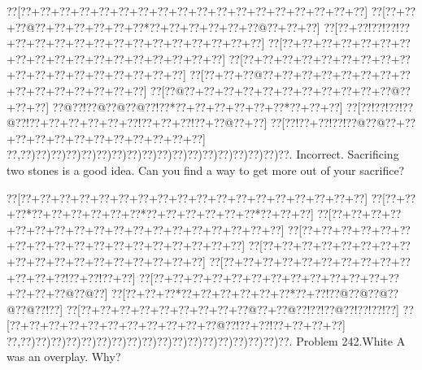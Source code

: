 \documentclass[a5paper]{article}
\begin{document}
\begin{center}
{\goo
\0??[\0??+\0??+\0??+\0??+\0??+\0??+\0??+\0??+\0??+\0??+\0??+\0??+\0??+\0??+\0??+\0??+\0??+\0??]
\0??[\0??+\0??+\0??@\0??+\0??+\0??+\0??+\0??+\0??*\0??+\0??+\0??+\0??+\0??+\0??@\0??+\0??+\0??]
\0??[\0??+\0??!\0??!\0??!\0??+\0??+\0??+\0??+\0??+\0??+\0??+\0??+\0??+\0??+\0??+\0??+\0??+\0??]
\0??[\0??+\0??+\0??+\0??+\0??+\0??+\0??+\0??+\0??+\0??+\0??+\0??+\0??+\0??+\0??+\0??+\0??+\0??]
\0??[\0??+\0??+\0??+\0??+\0??+\0??+\0??+\0??+\0??+\0??+\0??+\0??+\0??+\0??+\0??+\0??+\0??+\0??]
\0??[\0??+\0??+\0??@\0??+\0??+\0??+\0??+\0??+\0??+\0??+\0??+\0??+\0??+\0??+\0??+\0??+\0??+\0??]
\0??[\0??@\0??+\0??+\0??+\0??+\0??+\0??+\0??+\0??+\0??+\0??+\0??@\0??+\0??+\0??]
\0??@\0??!\0??@\0??@\0??@\0??!\0??*\0??+\0??+\0??+\0??+\0??+\0??*\0??+\0??+\0??]
\0??[\0??!\0??!\0??!\0??@\0??!\0??+\0??+\0??+\0??+\0??+\0??!\0??+\0??+\0??!\0??+\0??@\0??+\0??]
\0??[\0??!\0??+\0??!\0??!\0??@\0??@\0??+\0??+\0??+\0??+\0??+\0??+\0??+\0??+\0??+\0??+\0??+\0??]
\0??,\0??)\0??)\0??)\0??)\0??)\0??)\0??)\0??)\0??)\0??)\0??)\0??)\0??)\0??)\0??)\0??)\0??)\0??.
}
Incorrect. Sacrificing two stones is a good idea. Can you find a way to get more out of your sacrifice?

\end{center}
\newpage
\begin{center}
{\goo
\0??[\0??+\0??+\0??+\0??+\0??+\0??+\0??+\0??+\0??+\0??+\0??+\0??+\0??+\0??+\0??+\0??+\0??+\0??]
\0??[\0??+\0??+\0??*\0??+\0??+\0??+\0??+\0??+\0??*\0??+\0??+\0??+\0??+\0??+\0??*\0??+\0??+\0??]
\0??[\0??+\0??+\0??+\0??+\0??+\0??+\0??+\0??+\0??+\0??+\0??+\0??+\0??+\0??+\0??+\0??+\0??+\0??]
\0??[\0??+\0??+\0??+\0??+\0??+\0??+\0??+\0??+\0??+\0??+\0??+\0??+\0??+\0??+\0??+\0??+\0??+\0??]
\0??[\0??+\0??+\0??+\0??+\0??+\0??+\0??+\0??+\0??+\0??+\0??+\0??+\0??+\0??+\0??+\0??+\0??+\0??]
\0??[\0??+\0??+\0??+\0??+\0??+\0??+\0??+\0??+\0??+\0??+\0??+\0??+\0??!\0??+\0??!\0??+\0??]
\0??[\0??+\0??+\0??+\0??+\0??+\0??+\0??+\0??+\0??+\0??+\0??+\0??+\0??+\0??+\0??+\0??@\0??@\0??]
\0??[\0??+\0??+\0??*\0??+\0??+\0??+\0??+\0??+\0??*\0??+\0??!\0??@\0??@\0??@\0??@\0??@\0??!\0??]
\0??[\0??+\0??+\0??+\0??+\0??+\0??+\0??+\0??+\0??@\0??+\0??@\0??!\0??!\0??@\0??!\0??!\0??!\0??]
\0??[\0??+\0??+\0??+\0??+\0??+\0??+\0??+\0??+\0??+\0??+\0??@\0??!\0??+\0??!\0??+\0??+\0??+\0??]
\0??,\0??)\0??)\0??)\0??)\0??)\0??)\0??)\0??)\0??)\0??)\0??)\0??)\0??)\0??)\0??)\0??)\0??)\0??.
}
Problem 242.White A was an overplay. Why?

\end{center}
\end{document}
